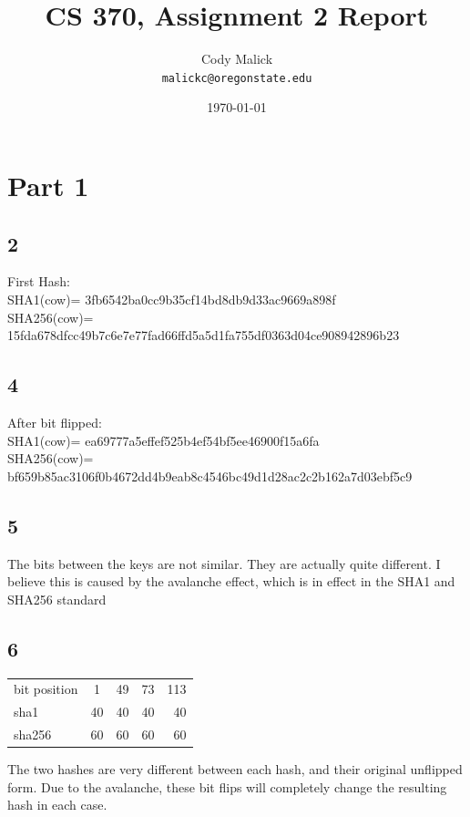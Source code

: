 \documentclass[10pt,letterpaper]{article}
\begin{document}
\title{CS 370, Assignment 2 Report}
\author{Cody Malick\\
\texttt{malickc@oregonstate.edu}}
\date{\today}
\maketitle
\section*{Part 1}

\subsection*{2}
First Hash:\\
SHA1(cow)= 3fb6542ba0cc9b35cf14bd8db9d33ac9669a898f\\
SHA256(cow)= 15fda678dfcc49b7c6e7e77fad66ffd5a5d1fa755df0363d04ce908942896b23\\

\subsection*{4}
After bit flipped:\\
SHA1(cow)= ea69777a5effef525b4ef54bf5ee46900f15a6fa \\
SHA256(cow)= bf659b85ac3106f0b4672dd4b9eab8c4546bc49d1d28ac2c2b162a7d03ebf5c9\\

\subsection*{5}
The bits between the keys are not similar. They are actually quite different.
I believe this is caused by the avalanche effect, which is in effect in the
SHA1 and SHA256 standard

\subsection*{6}
\begin{center}
	\begin{tabular}{l | c | c | c | r}
		bit position & 1 & 49 & 73 & 113 \\
		sha1 & 40 & 40 & 40 & 40 \\ 
		sha256 & 60 & 60 & 60 & 60 \\
	\end{tabular}
\end{center}

\noindent The two hashes are very different between each hash, and their original
unflipped form. Due to the avalanche, these bit flips will completely change the
resulting hash in each case. 
\end{document}
